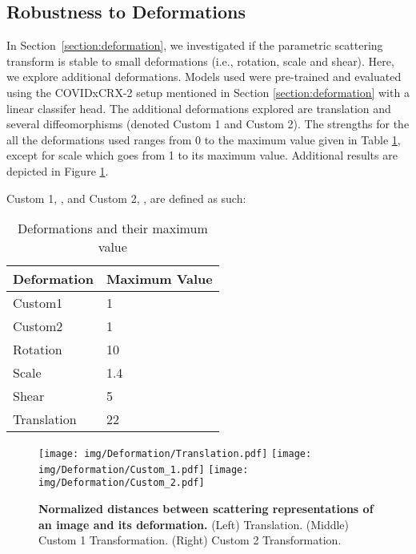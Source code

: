 \documentclass[10pt,twocolumn,letterpaper]{article}
\begin{document}
\begin{table*}[t]
\section{Robustness to Deformations}

\label{appendix:deformations}
In Section~\ref{section:deformation}, we investigated if the parametric scattering transform is stable to small deformations (i.e., rotation, scale and shear). Here, we explore additional deformations. Models used were pre-trained and evaluated using the COVIDxCRX-2 setup mentioned in Section \ref{section:deformation} with a linear classifer head. The additional deformations explored are translation and several diffeomorphisms (denoted Custom 1 and Custom 2). The strengths for the all the deformations used ranges from 0 to the maximum value given in Table \ref{table:deformations}, except for scale which goes from 1 to its maximum value. Additional results are depicted in Figure \ref{fig:defo-appendix}.

Custom 1, , and Custom 2, , are defined as such:


\begin{table}[H]
    \caption{Deformations and their maximum value\vspace{-10pt}}
    \centering
    \small
    
    \label{table:deformations}
      \fontsize{10}{10}\selectfont 
    \begin{tabular}{ll}
             \hline
          Deformation & Maximum Value\\
            \hline
           Custom1 & 1 \\
           Custom2 & 1 \\
           Rotation & 10 \\
           Scale & 1.4 \\
           Shear & 5 \\
           Translation & 22 \\
\end{tabular}
\end{table}
\begin{figure}[H]
    \centering
    \texttt{[image: img/Deformation/Translation.pdf]}
    \texttt{[image: img/Deformation/Custom\_1.pdf]}
    \texttt{[image: img/Deformation/Custom\_2.pdf]}
    \vspace{-10pt}
    \caption{\textbf{Normalized distances between scattering representations of an image and its deformation.} (Left) Translation. (Middle) Custom 1 Transformation. (Right) Custom 2 Transformation. }\label{fig:defo-appendix}
\end{figure}








\end{table*}
\end{document}
